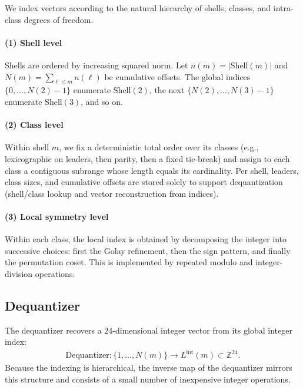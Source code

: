 \documentclass{article}
\theoremstyle{plain}
\theoremstyle{definition}
\theoremstyle{remark}
\begin{document}
We index vectors according to the natural hierarchy of shells, classes, and
intra-class degrees of freedom.
\vspace{-0.4em}
\paragraph{(1) Shell level}
Shells are ordered by increasing squared norm. Let $n(m)=|\mathrm{Shell}(m)|$
and $N(m)=\sum_{\ell \le m} n(\ell)$ be cumulative offsets. The global indices
$\{0,\dots,N(2)-1\}$ enumerate $\mathrm{Shell}(2)$, the next
$\{N(2),\dots,N(3)-1\}$ enumerate $\mathrm{Shell}(3)$, and so on.
\vspace{-0.4em}
\paragraph{(2) Class level}
Within shell $m$, we fix a deterministic total order over its classes (e.g.,
lexicographic on leaders, then parity, then a fixed tie-break) and assign to
each class a contiguous subrange whose length equals its cardinality. Per shell, leaders, class sizes, and cumulative offsets are stored solely to support dequantization (shell/class lookup and vector reconstruction from indices).
\vspace{-0.4em}
\paragraph{(3) Local symmetry level}
Within each class, the local index is obtained by decomposing the integer into
successive choices: first the Golay refinement, then the sign pattern, and
finally the permutation coset. This is implemented by repeated modulo and
integer-division operations.
\vspace{-0.4em}

\subsection{Dequantizer}
\label{sec:dequantizer}

The dequantizer recovers a $24$-dimensional integer vector from its global integer index:
{\setlength{\abovedisplayskip}{6pt}
\setlength{\belowdisplayskip}{6pt}
\setlength{\abovedisplayshortskip}{0pt}
\setlength{\belowdisplayshortskip}{2pt} %
\setlength{\jot}{3pt} %
\begin{align}
\mathrm{Dequantizer} : \{1,\dots,N(m)\} \to L^{\mathrm{int}}(m) \subset \mathbb{Z}^{24}.
\end{align}
}
Because the indexing is hierarchical, the inverse map of the dequantizer mirrors this structure and consists of a small number of inexpensive integer operations.
\vspace{-6pt}
\end{document}
